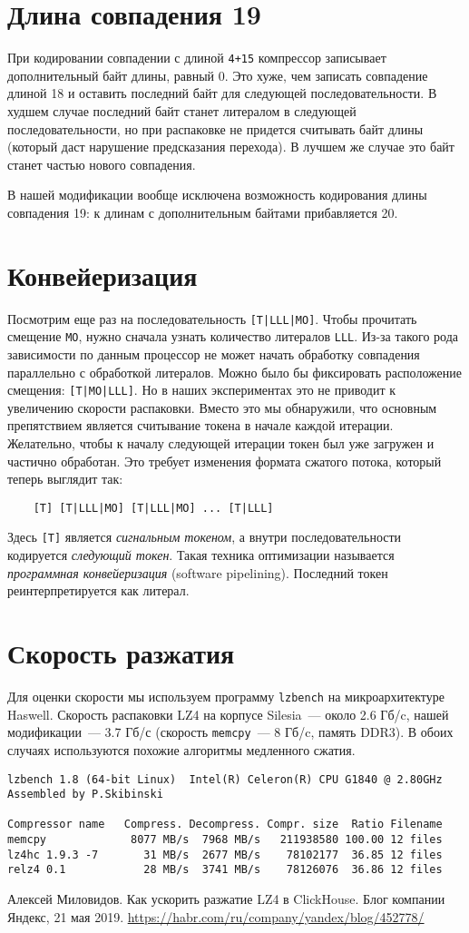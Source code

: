 \documentclass[russian,a4paper,12pt]{article}
\begin{document}
\section{Длина совпадения 19}
При кодировании совпадении с длиной \verb|4+15| компрессор записывает дополнительный байт длины, равный 0.
Это хуже, чем записать совпадение длиной 18 и оставить последний байт для следующей последовательности.
В худшем случае последний байт станет литералом в следующей последовательности, но при распаковке не придется
считывать байт длины (который даст нарушение предсказания перехода).  В лучшем же случае это байт
станет частью нового совпадения.

В нашей модификации вообще исключена возможность кодирования длины совпадения 19: к длинам с дополнительным
байтами прибавляется 20.

\section{Конвейеризация}
Посмотрим еще раз на последовательность \verb![T|LLL|MO]!.  Чтобы прочитать смещение \verb|MO|,
нужно сначала узнать количество литералов \verb|LLL|.  Из-за такого рода зависимости по данным
процессор не может начать обработку совпадения параллельно с обработкой литералов.  Можно было бы
фиксировать расположение смещения: \verb![T|MO|LLL]!.  Но в наших экспериментах это не приводит
к увеличению скорости распаковки.  Вместо это мы обнаружили, что основным препятствием является
считывание токена в начале каждой итерации.  Желательно, чтобы к началу следующей итерации токен
был уже загружен и частично обработан.  Это требует изменения формата сжатого потока, который
теперь выглядит так:
\begin{verbatim}
    [T] [T|LLL|MO] [T|LLL|MO] ... [T|LLL]
\end{verbatim}
Здесь \verb![T]! является \emph{сигнальным токеном}, а внутри последовательности кодируется
\emph{следующий токен}.  Такая техника оптимизации называется \emph{программная конвейеризация}
(software pipelining).  Последний токен реинтерпретируется как литерал.

\section{Скорость разжатия}
Для оценки скорости мы используем программу \verb|lzbench| на микроархитектуре Haswell.
Скорость распаковки LZ4 на корпусе Silesia~--- около 2.6 Гб/c, нашей модификации~--- 3.7 Гб/с
(скорость \verb|memcpy|~--- 8 Гб/c, память DDR3).  В обоих случаях используются похожие алгоритмы медленного сжатия.
\begin{verbatim}
lzbench 1.8 (64-bit Linux)  Intel(R) Celeron(R) CPU G1840 @ 2.80GHz
Assembled by P.Skibinski

Compressor name   Compress. Decompress. Compr. size  Ratio Filename
memcpy             8077 MB/s  7968 MB/s   211938580 100.00 12 files
lz4hc 1.9.3 -7       31 MB/s  2677 MB/s    78102177  36.85 12 files
relz4 0.1            28 MB/s  3741 MB/s    78126076  36.86 12 files
\end{verbatim}

\begin{thebibliography}{9}
 Алексей Миловидов.
Как ускорить разжатие LZ4 в ClickHouse.
Блог компании Яндекс, 21 мая 2019.
\url{https://habr.com/ru/company/yandex/blog/452778/}
\end{thebibliography}
\end{document}
